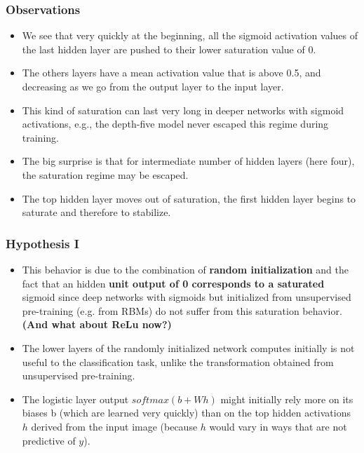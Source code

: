 \begin{frame}
  \frametitle{Observations}

  \begin{itemize}
    \item We see that very quickly at the beginning, all the sigmoid activation values of the last hidden layer are pushed to their lower saturation value of 0.
    
    \item The others layers have a mean activation value that is above 0.5, and decreasing as we go from the output layer to the input layer. 
    
    \item This kind of saturation can last very long in deeper networks with sigmoid activations, e.g., the depth-five model never escaped this regime during training. 
    
    \item The big surprise is that for intermediate number of hidden layers (here four), the saturation regime may be escaped. 
    
    \item The top hidden layer moves out of saturation, the first hidden layer begins to saturate and therefore to stabilize.

  \end{itemize}

\end{frame}

\begin{frame}
  \frametitle{Hypothesis I}

  \begin{itemize}
    \item This behavior is due to the combination of \textbf{random initialization} and the fact that an hidden \textbf{unit output of 0 corresponds to a saturated} sigmoid since  deep networks with sigmoids but initialized from unsupervised pre-training (e.g. from RBMs) do not suffer from this saturation behavior.
    \textbf{(And what about ReLu now?)}
    
    \item  The lower layers of the randomly initialized network computes initially is not useful to the classification task, unlike the transformation obtained from unsupervised pre-training.
    
    \item The logistic layer output $softmax(b + W h)$ might initially rely more on its biases b (which are learned very quickly) than on the top hidden activations $h$ derived from the input image (because $h$ would vary in ways that are not predictive of $y$). 
  \end{itemize}

\end{frame}


